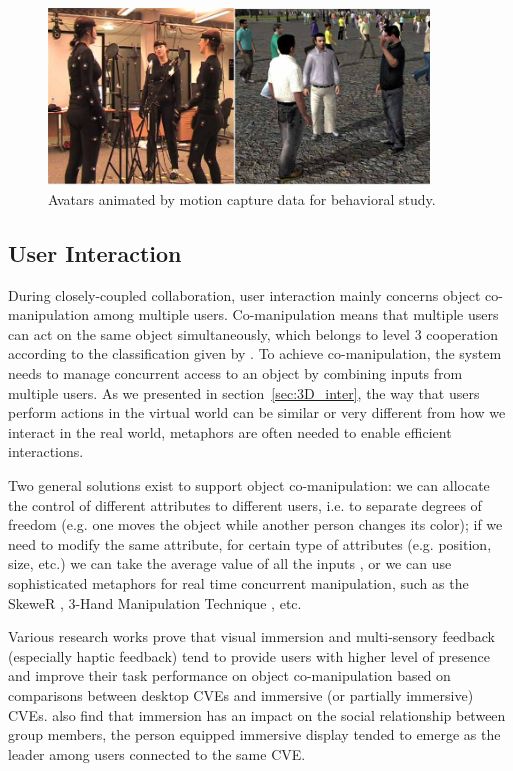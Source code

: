 \begin{figure}[htb]
  \centering
  \includegraphics[width=0.9\textwidth]{figures/ch1/commu_study}
  \caption{\label{fig:1_commu} Avatars animated by motion capture data for behavioral study.}
\end{figure}

\subsection{User Interaction}
During closely-coupled collaboration, user interaction mainly concerns object co-manipulation among multiple users. Co-manipulation means that multiple users can act on the same object simultaneously, which belongs to level 3 cooperation according to the classification given by \citet{Margery1999Framework}. To achieve co-manipulation, the system needs to manage concurrent access to an object by combining inputs from multiple users. As we presented in section~\ref{sec:3D_inter}, the way that users perform actions in the virtual world can be similar or very different from how we interact in the real world, metaphors are often needed to enable efficient interactions.

Two general solutions exist to support object co-manipulation: we can allocate the control of different attributes to different users, i.e. to separate degrees of freedom \citep{Pinho2002Cooperative} (e.g. one moves the object while another person changes its color); if we need to modify the same attribute, for certain type of attributes (e.g. position, size, etc.) we can take the average value of all the inputs \citep{Ruddle2002Symmetric}, or we can use sophisticated metaphors for real time concurrent manipulation, such as the SkeweR \citep{Duval2006Skewer}, 3-Hand Manipulation Technique \citep{Aguerreche2009Three}, etc.

Various research works prove that visual immersion \citep{Schroeder2001NIS, Roberts2003Gazebo, Narayan2005Quantifying} and multi-sensory feedback (especially haptic feedback) \citep{Nam2008Roles, Oguz2010Haptic} tend to provide users with higher level of presence and improve their task performance on object co-manipulation based on comparisons between desktop CVEs and immersive (or partially immersive) CVEs. \citet{Slater2000Small} also find that immersion has an impact on the social relationship between group members, the person equipped immersive display tended to emerge as the leader among users connected to the same CVE.



